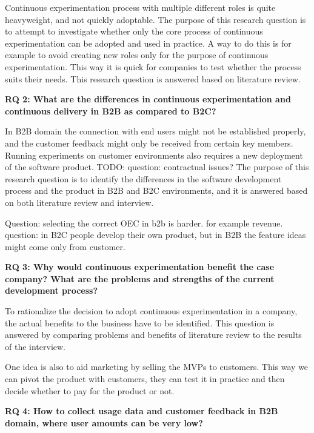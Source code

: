\documentclass[english]{tktltiki2}
\theoremstyle{definition}
\theoremstyle{remark}
\begin{document}
\noindent Continuous experimentation process with multiple different roles is quite heavyweight, and not quickly adoptable. The purpose of this research question is to attempt to investigate whether only the core process of continuous experimentation can be adopted and used in practice. A way to do this is for example to avoid creating new roles only for the purpose of continuous experimentation. This way it is quick for companies to test whether the process suits their needs. This research question is answered based on literature review. \newline


\noindent \textbf{RQ 2: What are the differences in continuous experimentation and continuous delivery in B2B as compared to B2C?}

\noindent In B2B domain the connection with end users might not be established properly, and the customer feedback might only be received from certain key members. Running experiments on customer environments also requires a new deployment of the software product. TODO: question: contractual issues? The purpose of this research question is to identify the differences in the software development process and the product in B2B and B2C environments, and it is answered based on both literature review and interview. \newline

Question: selecting the correct OEC in b2b is harder. for example revenue. 
question: in B2C people develop their own product, but in B2B the feature ideas might come only from customer.

\noindent \textbf{RQ 3: Why would continuous experimentation benefit the case company? What are the problems and strengths of the current development process?}

\noindent To rationalize the decision to adopt continuous experimentation in a company, the actual benefits to the business have to be identified. This question is answered by comparing problems and benefits of literature review to the results of the interview. \newline

One idea is also to aid marketing by selling the MVPs to customers. This way we can pivot the product with customers, they can test it in practice and then decide whether to pay for the product or not.

\noindent \textbf{RQ 4: How to collect usage data and customer feedback in B2B domain, where user amounts can be very low?}
\end{document}
